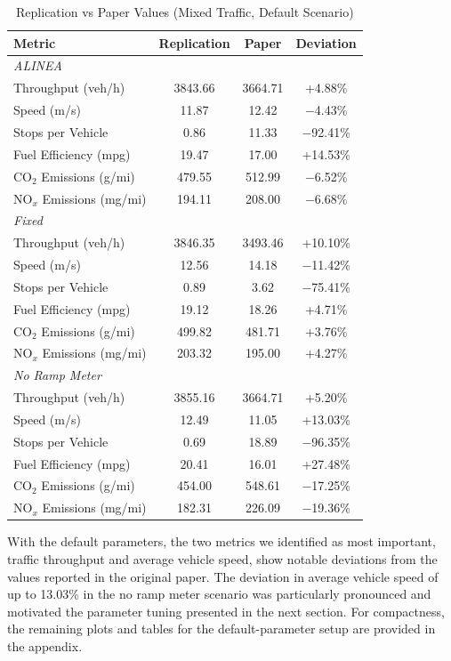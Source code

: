 \begin{table}[H]
\centering
\small
\caption{Replication vs Paper Values (Mixed Traffic, Default Scenario)}
\begin{tabular}{l c c c}
\toprule
\textbf{Metric} & \textbf{Replication} & \textbf{Paper} & \textbf{Deviation} \\
\midrule
\multicolumn{4}{l}{\textit{ALINEA}} \\
\midrule
Throughput (veh/h)       & 3843.66 & 3664.71 & +4.88\% \\
Speed (m/s)              & 11.87   & 12.42   & $-$4.43\% \\
Stops per Vehicle        & 0.86    & 11.33   & $-$92.41\% \\
Fuel Efficiency (mpg)    & 19.47   & 17.00   & +14.53\% \\
CO$_2$ Emissions (g/mi)  & 479.55  & 512.99  & $-$6.52\% \\
NO$_x$ Emissions (mg/mi) & 194.11  & 208.00  & $-$6.68\% \\
\midrule
\multicolumn{4}{l}{\textit{Fixed}} \\
\midrule
Throughput (veh/h)       & 3846.35 & 3493.46 & +10.10\% \\
Speed (m/s)              & 12.56   & 14.18   & $-$11.42\% \\
Stops per Vehicle        & 0.89    & 3.62    & $-$75.41\% \\
Fuel Efficiency (mpg)    & 19.12   & 18.26   & +4.71\% \\
CO$_2$ Emissions (g/mi)  & 499.82  & 481.71  & +3.76\% \\
NO$_x$ Emissions (mg/mi) & 203.32  & 195.00  & +4.27\% \\
\midrule
\multicolumn{4}{l}{\textit{No Ramp Meter}} \\
\midrule
Throughput (veh/h)       & 3855.16 & 3664.71 & +5.20\% \\
Speed (m/s)              & 12.49   & 11.05   & +13.03\% \\
Stops per Vehicle        & 0.69    & 18.89   & $-$96.35\% \\
Fuel Efficiency (mpg)    & 20.41   & 16.01   & +27.48\% \\
CO$_2$ Emissions (g/mi)  & 454.00  & 548.61  & $-$17.25\% \\
NO$_x$ Emissions (mg/mi) & 182.31  & 226.09  & $-$19.36\% \\
\bottomrule
\end{tabular}
\end{table}

With the default parameters, the two metrics we identified as most important, traffic throughput 
and average vehicle speed, show notable deviations from the values reported in the original paper.
The deviation in average vehicle speed of up to 13.03\% in the no ramp meter scenario was particularly pronounced and motivated the parameter tuning presented in the next section. 
For compactness, the remaining plots and tables for the default-parameter setup are provided in the appendix.




